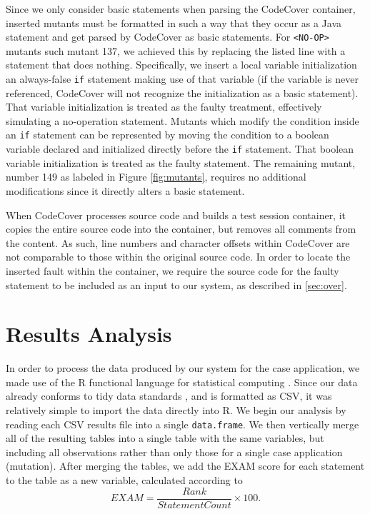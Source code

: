 Since we only consider basic statements when parsing the CodeCover container, inserted mutants
must be formatted in such a way that they occur as a Java statement and get parsed by CodeCover
as basic statements.  For \texttt{<NO-OP>} mutants such mutant 137, we achieved this by replacing
the listed line with a statement that does nothing.  Specifically, we insert a local variable 
initialization an always-false \texttt{if} statement making use of that variable (if the variable
is never referenced, CodeCover will not recognize the initialization as a basic statement).  That 
variable initialization is treated as the faulty treatment, effectively simulating a no-operation
statement.  Mutants which modify the condition inside an \texttt{if} statement can be represented by 
moving the condition to a boolean variable declared and initialized directly before the \texttt{if}
statement.  That boolean variable initialization is treated as the faulty statement.  The remaining
mutant, number 149 as labeled in Figure \ref{fig:mutants}, requires no additional modifications since
it directly alters a basic statement.

When CodeCover processes source code and builds a test session container, it copies the entire source
code into the container, but removes all comments from the content.  As such, line numbers and character
offsets within CodeCover are not comparable to those within the original source code.  In
order to locate the inserted fault within the container, we require the source code for the faulty
statement to be included as an input to our system, as described in \ref{sec:over}.

\section{Results Analysis}\label{sec:data}

In order to process the data produced by our system for the case application, we made use of the
R functional language for statistical computing \cite{r}.  Since our data already conforms
to tidy data standards \cite{tidy}, and is formatted as CSV, it was relatively simple to import the
data directly into R.  We begin our analysis by reading each CSV results file into a single 
\texttt{data.frame}.  We then vertically merge all of the resulting tables into a single table with
the same variables, but including all observations rather than only those for a single case 
application (mutation).  After merging the tables, we add the EXAM score for each statement to the table 
as a new variable, calculated according to \[EXAM = \frac{Rank}{StatementCount} \times 100.\]

